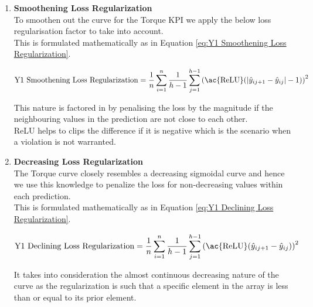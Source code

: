 \documentclass{report} %
\begin{document}
\begin{enumerate}

\item \textbf{Smoothening Loss Regularization} \\

To smoothen out the curve for the Torque \ac{KPI} we apply the below loss regularisation factor to take into account.\\
This is formulated mathematically as in Equation \ref{eq:Y1 Smoothening Loss Regularization}.

\begin{equation}
\text{Y1 Smoothening Loss Regularization} = \frac{1}{n} \sum_{i=1}^{n}\frac{1}{h-1} \sum_{j=1}^{h-1} \left(\text{\ac{ReLU}}(|\hat{y}_{i{j+1}} - \hat{y}_{ij}| - 1)\right)^2 
\label{eq:Y1 Smoothening Loss Regularization}
\end{equation} 

\vspace{0.2cm} %

This nature is factored in by penalising the loss by the magnitude if the neighbouring values in the prediction are not close to each other.\\
\ac{ReLU} helps to clips the difference if it is negative which is the scenario when a violation is not warranted. \\

\item \textbf{Decreasing Loss Regularization} \\

The Torque curve closely resembles a decreasing sigmoidal curve and hence we use this knowledge to penalize the loss for non-decreasing values within each prediction. \\
This is formulated mathematically as in Equation \ref{eq:Y1 Declining Loss Regularization}.

\begin{equation}
    \text{Y1 Declining Loss Regularization} = \frac{1}{n} \sum_{i=1}^{n}\frac{1}{h-1} \sum_{j=1}^{h-1} \left(\text{\ac{ReLU}}(\hat{y}_{i{j+1}} - \hat{y}_{ij})\right)^2
    \label{eq:Y1 Declining Loss Regularization}
\end{equation} 
    
It takes into consideration the almost continuous decreasing nature of the curve as the regularization is such that a specific element in the array is less than or equal to its prior element. \\


\end{enumerate}
\end{document}

